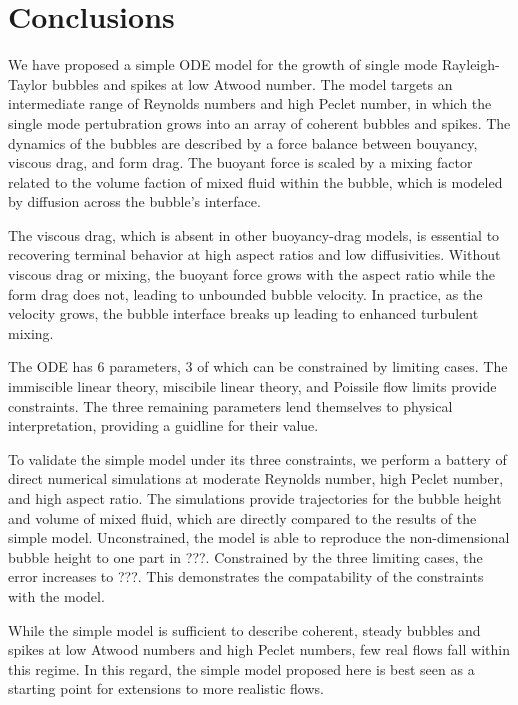 \section{Conclusions}

We have proposed a simple ODE model for the growth of single mode Rayleigh-Taylor bubbles and spikes at low Atwood number.
The model targets an intermediate range of Reynolds numbers and high Peclet number, in which the single mode pertubration grows into an array of coherent bubbles and spikes.
The dynamics of the bubbles are described by a force balance between bouyancy, viscous drag, and form drag.
The buoyant force is scaled by a mixing factor related to the volume faction of mixed fluid within the bubble, which is modeled by diffusion across the bubble's interface.

The viscous drag, which is absent in other buoyancy-drag models, is essential to recovering terminal behavior at high aspect ratios and low diffusivities.  
Without viscous drag or mixing, the buoyant force grows with the aspect ratio while the form drag does not, leading to unbounded bubble velocity.
In practice, as the velocity grows, the bubble interface breaks up leading to enhanced turbulent mixing.

The ODE has 6 parameters, 3 of which can be constrained by limiting cases.
The immiscible linear theory, miscibile linear theory, and Poissile flow limits provide constraints.
The three remaining parameters lend themselves to physical interpretation, providing a guidline for their value.

To validate the simple model under its three constraints, we perform a battery of direct numerical simulations at moderate Reynolds number, high Peclet number, and high aspect ratio.
The simulations provide trajectories for the bubble height and volume of mixed fluid, which are directly compared to the results of the simple model.
Unconstrained, the model is able to reproduce the non-dimensional bubble height to one part in ???.
Constrained by the three limiting cases, the error increases to ???.
This demonstrates the compatability of the constraints with the model.

While the simple model is sufficient to describe coherent, steady bubbles and spikes at low Atwood numbers and high Peclet numbers, few real flows fall within this regime.
In this regard, the simple model proposed here is best seen as a starting point for extensions to more realistic flows.
